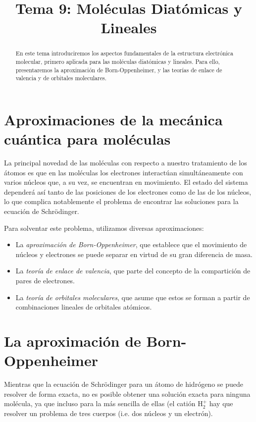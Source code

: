 \documentclass{tufte-handout}
\title[Química Física II: Tema 9 - Moléculas Diatómicas y Lineales]{
Tema 9: Moléculas Diatómicas y Lineales}
\date{}  %
\begin{document}
\maketitle%

\begin{abstract}
\noindent En este tema introduciremos los aspectos 
fundamentales de la estructura electrónica molecular, primero
aplicada para las moléculas diatómicas y lineales. Para ello, presentaremos la aproximación de Born-Oppenheimer, y las teorías de enlace de valencia y de orbitales moleculares.
\end{abstract}


\section{Aproximaciones de la mecánica cuántica para moléculas}
La principal novedad de las 
moléculas con respecto a nuestro tratamiento de los
átomos es que en las moléculas los electrones interactúan simultáneamente
con varios núcleos que, a su vez, se encuentran en
movimiento. El estado del sistema dependerá así tanto 
de las posiciones de los electrones como de las de los 
núcleos, lo que complica notablemente el problema de
encontrar las soluciones para la ecuación de Schrödinger. 

Para solventar este problema, utilizamos diversas 
aproximaciones:
\begin{itemize}
\item La \textit{aproximación de Born-Oppenheimer}, que establece
que el movimiento de núcleos y electrones se puede
separar en virtud de su gran diferencia de masa.
\item La \textit{teoría de enlace de valencia}, que parte del 
concepto de la compartición de pares de electrones.
\item La \textit{teoría de orbitales moleculares}, que asume que
estos se forman a partir de combinaciones lineales de 
orbitales atómicos. 
\end{itemize}

\section{La aproximación de Born-Oppenheimer}
Mientras que la ecuación de Schrödinger para un átomo 
de hidrógeno se puede resolver de forma exacta, no es 
posible obtener una solución exacta para ninguna molécula,
ya que incluso para la más sencilla de ellas (el catión
H$_2^+$ hay que resolver un problema de tres cuerpos 
(i.e. dos núcleos y un electrón). 
\end{document}
